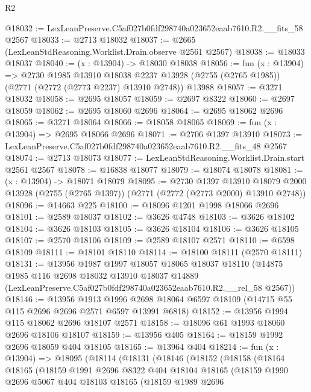 \begin{lexlean}{R2}
\begin{coremodule}
@18032 := LexLeanPreserve.C5af027b0fdf298740a023652eaab7610.R2.__fits_58 @2567
@18033 := @2713 @18032
@18037 := @2665 (LexLeanStdReasoning.Worklist.Drain.observe @2561 @2567)
@18038 := @18033 @18037
@18040 := (x : @13904) -> @18030 @18038
@18056 := fun (x : @13904) =>
  @2730
    @1985
    @13910
    @18038
    @2237
    @13928
    (@2755 (@2765 @1985))
    (@2771 (@2772 (@2773 @2237) @13910 @2748))
    @13988
@18057 := @3271 @18032
@18058 := @2695 @18057
@18059 := @2697 @8322
@18060 := @2697 @18059
@18062 := @2695 @18060 @2696
@18064 := @2695 @18062 @2696
@18065 := @3271 @18064
@18066 := @18058 @18065
@18069 := fun (x : @13904) => @2695 @18066 @2696
@18071 := @2706 @1397 @13910
@18073 := LexLeanPreserve.C5af027b0fdf298740a023652eaab7610.R2.__fits_48 @2567
@18074 := @2713 @18073
@18077 := LexLeanStdReasoning.Worklist.Drain.start @2561 @2567
@18078 := @16838 @18077
@18079 := @18074 @18078
@18081 := (x : @13904) -> @18071 @18079
@18095 := @2730
    @1397
    @13910
    @18079
    @2000
    @13928
    (@2755 (@2765 @1397))
    (@2771 (@2772 (@2773 @2000) @13910 @2748))
@18096 := @14663 @225
@18100 := @18096 @1201 @1998 @18066 @2696
@18101 := @2589 @18037
@18102 := @3626 @4748
@18103 := @3626 @18102
@18104 := @3626 @18103
@18105 := @3626 @18104
@18106 := @3626 @18105
@18107 := @2570 @18106
@18109 := @2589 @18107 @2571
@18110 := @6598 @18109
@18111 := @18101 @18110
@18114 := @18100 @18111 (@2570 @18111)
@18131 := @13956
    @1987
    @1997
    @18057
    @18065
    @18037
    @18110
    (@14875
      @1985
      @116
      @2698
      @18032
      @13910
      @18037
      @14889
      (LexLeanPreserve.C5af027b0fdf298740a023652eaab7610.R2.__rel_58 @2567))
@18146 := @13956
    @1913
    @1996
    @2698
    @18064
    @6597
    @18109
    (@14715 @55 @115 @2696 @2696 @2571 @6597 @13991 @6818)
@18152 := @13956 @1994 @115 @18062 @2696 @18107 @2571
@18158 := @18096 @61 @1993 @18060 @2696 @18106 @18107
@18159 := @13956 @405
@18164 := @18159 @1992 @2696 @18059 @404 @18105
@18165 := @13964 @404
@18214 := fun (x : @13904) =>
  @18095
    (@18114
      (@18131
        (@18146
          (@18152
            (@18158
              (@18164
                @18165
                (@18159
                  @1991
                  @2696
                  @8322
                  @404
                  @18104
                  @18165
                  (@18159
                    @1990
                    @2696
                    @5067
                    @404
                    @18103
                    @18165
                    (@18159
                      @1989
                      @2696

\end{coremodule}
\end{lexlean}
